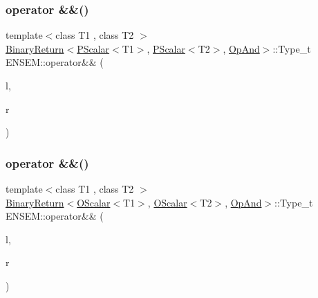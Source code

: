 \mbox{\label{namespaceENSEM_ga3853388d3b3d994d263d1da57ffcb055}} 
\subsubsection{\texorpdfstring{operator \&\&()}{operator \&\&()}\hspace{0.1cm}{\footnotesize\ttfamily [1/7]}}
{\footnotesize\ttfamily template$<$class T1 , class T2 $>$ \\
\mbox{\hyperlink{structENSEM_1_1BinaryReturn}{Binary\+Return}}$<$\mbox{\hyperlink{classENSEM_1_1PScalar}{P\+Scalar}}$<$T1$>$, \mbox{\hyperlink{classENSEM_1_1PScalar}{P\+Scalar}}$<$T2$>$, \mbox{\hyperlink{structENSEM_1_1OpAnd}{Op\+And}}$>$\+::Type\+\_\+t E\+N\+S\+E\+M\+::operator\&\& (\begin{DoxyParamCaption}\item[{const \mbox{\hyperlink{classENSEM_1_1PScalar}{P\+Scalar}}$<$ T1 $>$ \&}]{l,  }\item[{const \mbox{\hyperlink{classENSEM_1_1PScalar}{P\+Scalar}}$<$ T2 $>$ \&}]{r }\end{DoxyParamCaption})\hspace{0.3cm}{\ttfamily [inline]}}

\mbox{\label{namespaceENSEM_ga7e3b0e4d68793d07ed6616df54117609}} 
\subsubsection{\texorpdfstring{operator \&\&()}{operator \&\&()}\hspace{0.1cm}{\footnotesize\ttfamily [2/7]}}
{\footnotesize\ttfamily template$<$class T1 , class T2 $>$ \\
\mbox{\hyperlink{structENSEM_1_1BinaryReturn}{Binary\+Return}}$<$\mbox{\hyperlink{classENSEM_1_1OScalar}{O\+Scalar}}$<$T1$>$, \mbox{\hyperlink{classENSEM_1_1OScalar}{O\+Scalar}}$<$T2$>$, \mbox{\hyperlink{structENSEM_1_1OpAnd}{Op\+And}}$>$\+::Type\+\_\+t E\+N\+S\+E\+M\+::operator\&\& (\begin{DoxyParamCaption}\item[{const \mbox{\hyperlink{classENSEM_1_1OScalar}{O\+Scalar}}$<$ T1 $>$ \&}]{l,  }\item[{const \mbox{\hyperlink{classENSEM_1_1OScalar}{O\+Scalar}}$<$ T2 $>$ \&}]{r }\end{DoxyParamCaption})\hspace{0.3cm}{\ttfamily [inline]}}

